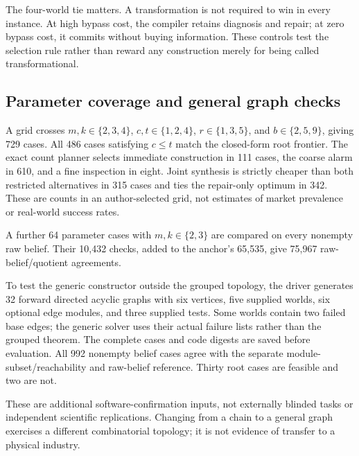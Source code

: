 \documentclass[11pt,letterpaper]{article}
\theoremstyle{remark}\newtheorem{remark}{Remark}[section]
\begin{document}
The four-world tie matters. A transformation is not required to win in every instance. At high bypass cost, the compiler retains diagnosis and repair; at zero bypass cost, it commits without buying information. These controls test the selection rule rather than reward any construction merely for being called transformational.

\subsection{Parameter coverage and general graph checks}
A grid crosses $m,k\in\{2,3,4\}$, $c,t\in\{1,2,4\}$, $r\in\{1,3,5\}$, and $b\in\{2,5,9\}$, giving 729 cases. All 486 cases satisfying $c\le t$ match the closed-form root frontier. The exact count planner selects immediate construction in 111 cases, the coarse alarm in 610, and a fine inspection in eight. Joint synthesis is strictly cheaper than both restricted alternatives in 315 cases and ties the repair-only optimum in 342. These are counts in an author-selected grid, not estimates of market prevalence or real-world success rates.

A further 64 parameter cases with $m,k\in\{2,3\}$ are compared on every nonempty raw belief. Their 10,432 checks, added to the anchor's 65,535, give 75,967 raw-belief/quotient agreements.

To test the generic constructor outside the grouped topology, the driver generates 32 forward directed acyclic graphs with six vertices, five supplied worlds, six optional edge modules, and three supplied tests. Some worlds contain two failed base edges; the generic solver uses their actual failure lists rather than the grouped theorem. The complete cases and code digests are saved before evaluation. All 992 nonempty belief cases agree with the separate module-subset/reachability and raw-belief reference. Thirty root cases are feasible and two are not.

These are additional software-confirmation inputs, not externally blinded tasks or independent scientific replications. Changing from a chain to a general graph exercises a different combinatorial topology; it is not evidence of transfer to a physical industry.
\end{document}
